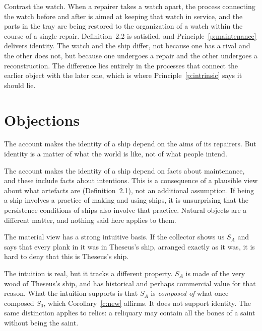 \documentclass{situationist-preprint}
\begin{document}
Contrast the watch. When a repairer takes a watch apart, the process connecting the watch before and after is aimed at keeping that watch in service, and the parts in the tray are being restored to the organization of a watch within the course of a single repair. Definition~2.2 is satisfied, and Principle~\ref{p:maintenance} delivers identity. The watch and the ship differ, not because one has a rival and the other does not, but because one undergoes a repair and the other undergoes a reconstruction. The difference lies entirely in the processes that connect the earlier object with the later one, which is where Principle~\ref{p:intrinsic} says it should lie.

\section{Objections}

\begin{objection}
The account makes the identity of a ship depend on the aims of its repairers. But identity is a matter of what the world is like, not of what people intend.
\end{objection}

\begin{reply}
The account makes the identity of a ship depend on facts about maintenance, and these include facts about intentions. This is a consequence of a plausible view about what artefacts are (Definition~2.1), not an additional assumption. If being a ship involves a practice of making and using ships, it is unsurprising that the persistence conditions of ships also involve that practice. Natural objects are a different matter, and nothing said here applies to them.
\end{reply}

\begin{objection}
The material view has a strong intuitive basis. If the collector shows us $S_A$ and says that every plank in it was in Theseus's ship, arranged exactly as it was, it is hard to deny that this is Theseus's ship.
\end{objection}

\begin{reply}
The intuition is real, but it tracks a different property. $S_A$ is made of the very wood of Theseus's ship, and has historical and perhaps commercial value for that reason. What the intuition supports is that $S_A$ is \emph{composed of} what once composed $S_0$, which Corollary~\ref{c:new} affirms. It does not support identity. The same distinction applies to relics: a reliquary may contain all the bones of a saint without being the saint.
\end{reply}
\end{document}
